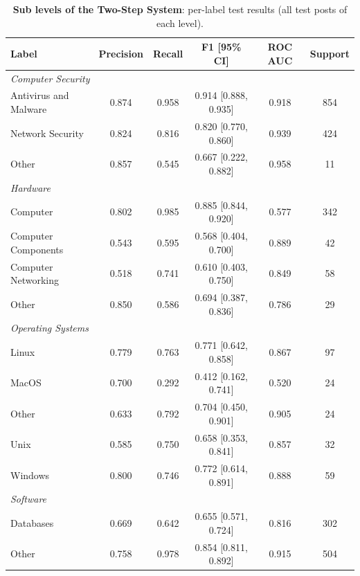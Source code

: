 \begin{table}
    \centering
    \caption{\textbf{Sub levels of the Two-Step System}: per-label test results (all test posts of each level).}
    \label{tab:two-step-sub}
    \small
    \begin{tabular}{lccccc}
        \hline
        \textbf{Label} & \textbf{Precision} & \textbf{Recall} & \textbf{F1 [95{\%} CI]} & \textbf{ROC AUC} & \textbf{Support} \\
        \hline
        \multicolumn{6}{l}{\textit{Computer Security}} \\
        Antivirus and Malware & 0.874 & 0.958 & 0.914 [0.888, 0.935] & 0.918 & 854 \\
        Network Security & 0.824 & 0.816 & 0.820 [0.770, 0.860] & 0.939 & 424 \\
        Other & 0.857 & 0.545 & 0.667 [0.222, 0.882] & 0.958 & 11 \\
        \hline
        \multicolumn{6}{l}{\textit{Hardware}} \\
        Computer & 0.802 & 0.985 & 0.885 [0.844, 0.920] & 0.577 & 342 \\
        Computer Components & 0.543 & 0.595 & 0.568 [0.404, 0.700] & 0.889 & 42 \\
        Computer Networking & 0.518 & 0.741 & 0.610 [0.403, 0.750] & 0.849 & 58 \\
        Other & 0.850 & 0.586 & 0.694 [0.387, 0.836] & 0.786 & 29 \\
        \hline
        \multicolumn{6}{l}{\textit{Operating Systems}} \\
        Linux & 0.779 & 0.763 & 0.771 [0.642, 0.858] & 0.867 & 97 \\
        MacOS & 0.700 & 0.292 & 0.412 [0.162, 0.741] & 0.520 & 24 \\
        Other & 0.633 & 0.792 & 0.704 [0.450, 0.901] & 0.905 & 24 \\
        Unix & 0.585 & 0.750 & 0.658 [0.353, 0.841] & 0.857 & 32 \\
        Windows & 0.800 & 0.746 & 0.772 [0.614, 0.891] & 0.888 & 59 \\
        \hline
        \multicolumn{6}{l}{\textit{Software}} \\
        Databases & 0.669 & 0.642 & 0.655 [0.571, 0.724] & 0.816 & 302 \\
        Other & 0.758 & 0.978 & 0.854 [0.811, 0.892] & 0.915 & 504 \\
        \hline
    \end{tabular}
\end{table}

